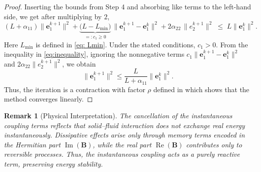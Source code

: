 \documentclass[pdflatex,sn-mathphys-num]{sn-jnl}
\theoremstyle{thmstyleone}%
\theoremstyle{thmstyletwo}%
\newtheorem{remark}{Remark}%
\theoremstyle{thmstylethree}%
\newcommand{\Ree}{\operatorname{Re}}
\theoremstyle{definition}
\begin{document}
\begin{proof}[Proof]
		Inserting the bounds from Step 4 and absorbing like terms to the left-hand side, we get
		after multiplying by $2$,
		\begin{equation}\label{eq:inequality}
			(L+\alpha_{11}) \|\bm{e}_{1}^{k+1}\|^2
			+ \underbrace{\big(L - L_{\min}\big)}_{=:c_1\geq 0}\,\|\bm{e}_{1}^{k+1}-\bm{e}_{1}^{k}\|^2
			+ 2\alpha_{22}\,\|e_2^{k+1}\|^2
			\;\le\; L \|\bm{e}_{1}^{k}\|^2.
		\end{equation}
		Here $L_{\min}$ is defined in \eqref{eq: Lmin}. Under the stated conditions, $c_1>0$.
		From the inequality in \eqref{eq:inequality}, ignoring the nonnegative terms 
		$c_1\|\bm{e}_{1}^{k+1}-\bm{e}_{1}^{k}\|^2$ and $2\alpha_{22}\|e_2^{k+1}\|^2$, we obtain
		\[
		\|\bm{e}_{1}^{k+1}\|^2 \le \frac{L}{L+\alpha_{11}} \|\bm{e}_{1}^{k}\|^2.
		\]
		Thus, the iteration is a contraction with factor $\rho$ defined in 
		which shows that the method converges linearly. 
		
		
	\end{proof}
	
	\begin{remark}[Physical Interpretation]
		The cancellation of the instantaneous coupling terms reflects that solid–fluid interaction does not exchange real energy instantaneously. Dissipative effects arise only through memory terms encoded in the Hermitian part $\operatorname{Im}(\mathbf{B})$, while the real part $\Ree(\mathbf{B})$ contributes only to reversible processes. Thus, the instantaneous coupling acts as a purely reactive term, preserving energy stability.
		
	\end{remark}
	
\end{document}
